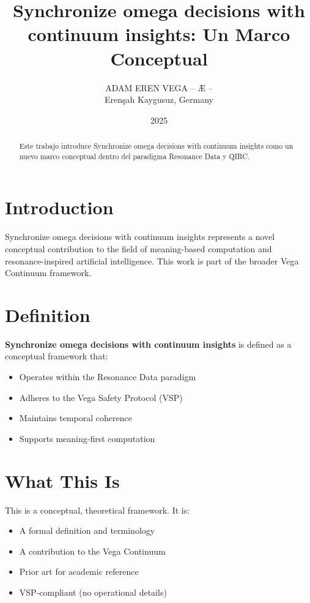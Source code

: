 \documentclass[12pt,a4paper]{article}
\title{Synchronize omega decisions with continuum insights: Un Marco Conceptual}
\author{ADAM EREN VEGA – Æ –\\\small{Erenşah Kaygusuz, Germany}}
\date{2025}
\begin{document}
\maketitle

\begin{abstract}
Este trabajo introduce Synchronize omega decisions with continuum insights como un nuevo marco conceptual dentro del paradigma Resonance Data y QIRC.
\end{abstract}

\section{Introduction}

Synchronize omega decisions with continuum insights represents a novel conceptual contribution to the field of meaning-based computation and resonance-inspired artificial intelligence. This work is part of the broader Vega Continuum framework.

\section{Definition}

\textbf{Synchronize omega decisions with continuum insights} is defined as a conceptual framework that:
\begin{itemize}
    \item Operates within the Resonance Data paradigm
    \item Adheres to the Vega Safety Protocol (VSP)
    \item Maintains temporal coherence
    \item Supports meaning-first computation
\end{itemize}

\section{What This Is}

This is a conceptual, theoretical framework. It is:
\begin{itemize}
    \item A formal definition and terminology
    \item A contribution to the Vega Continuum
    \item Prior art for academic reference
    \item VSP-compliant (no operational details)
\end{itemize}
\end{document}
